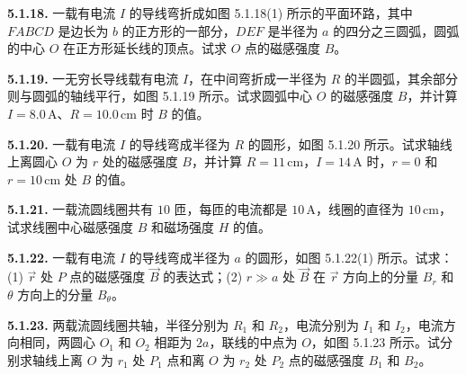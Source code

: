 \vfill
\newpage

\textbf{5.1.18.} 一载有电流 $I$ 的导线弯折成如图 5.1.18(1) 所示的平面环路，其中 $FABCD$ 是边长为 $b$ 的正方形的一部分，$DEF$ 是半径为 $a$ 的四分之三圆弧，圆弧的中心 $O$ 在正方形延长线的顶点。试求 $O$ 点的磁感强度 $B$。

\begin{center}
\end{center}

\vfill
\newpage

\textbf{5.1.19.} 一无穷长导线载有电流 $I$，在中间弯折成一半径为 $R$ 的半圆弧，其余部分则与圆弧的轴线平行，如图 5.1.19 所示。试求圆弧中心 $O$ 的磁感强度 $B$，并计算 $I = 8.0\,\mathrm{A}$、$R = 10.0\,\mathrm{cm}$ 时 $B$ 的值。

\begin{center}
\end{center}

\vfill
\newpage

\textbf{5.1.20.} 一载有电流 $I$ 的导线弯成半径为 $R$ 的圆形，如图 5.1.20 所示。试求轴线上离圆心 $O$ 为 $r$ 处的磁感强度 $B$，并计算 $R = 11\,\mathrm{cm}$，$I = 14\,\mathrm{A}$ 时，$r = 0$ 和 $r = 10\,\mathrm{cm}$ 处 $B$ 的值。

\begin{center}
\end{center}

\vfill
\newpage

\textbf{5.1.21.} 一载流圆线圈共有 $10$ 匝，每匝的电流都是 $10\,\mathrm{A}$，线圈的直径为 $10\,\mathrm{cm}$，试求线圈中心磁感强度 $B$ 和磁场强度 $H$ 的值。

\vfill
\newpage

\textbf{5.1.22.} 一载有电流 $I$ 的导线弯成半径为 $a$ 的圆形，如图 5.1.22(1) 所示。试求：(1) $\vec{r}$ 处 $P$ 点的磁感强度 $\vec{B}$ 的表达式；(2) $r \gg a$ 处 $\vec{B}$ 在 $\vec{r}$ 方向上的分量 $B_{r}$ 和 $\theta$ 方向上的分量 $B_{\theta}$。

\begin{center}
\end{center}

\vfill
\newpage

\textbf{5.1.23.} 两载流圆线圈共轴，半径分别为 $R_{1}$ 和 $R_{2}$，电流分别为 $I_{1}$ 和 $I_{2}$，电流方向相同，两圆心 $O_{1}$ 和 $O_{2}$ 相距为 $2a$，联线的中点为 $O$，如图 5.1.23 所示。试分别求轴线上离 $O$ 为 $r_{1}$ 处 $P_{1}$ 点和离 $O$ 为 $r_{2}$ 处 $P_{2}$ 点的磁感强度 $B_{1}$ 和 $B_{2}$。

